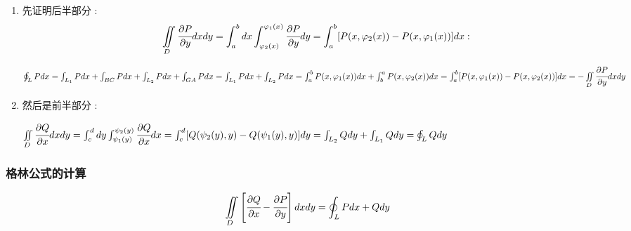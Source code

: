 \documentclass[UTF8,12pt]{ctexbook}
\newcommand{\definiteIntegral}[2]{\int^{#1}_{#2}}
\newcommand{\partialDerivativeFrac}[2]{\cfrac{\partial #1}{\partial #2}}
\newcommand{\doubleIntegralOnZone}[1]{\iint\limits_{#1}}
\newcommand{\mediumBigCase}[1]{\left[#1\right]}
\newcommand{\pathIntegral}[1]{\int_{#1}}
\newcommand{\curveIntegralOnLine}[1]{\oint_{#1}}
\begin{document}
{{{{      \begin{enumerate}
        \item {
              先证明后半部分 :
              $$
                \doubleIntegralOnZone{D}\partialDerivativeFrac{P}{y}dxdy = \definiteIntegral{b}{a}dx\definiteIntegral{\varphi_1(x)}{\varphi_2(x)}\partialDerivativeFrac{P}{y}dy = \definiteIntegral{b}{a}[P(x,\varphi_2(x)) - P(x,\varphi_1(x))]dx :
              $$

              \begin{math}
                \curveIntegralOnLine{L}Pdx \\
                = \pathIntegral{L_1}Pdx + \pathIntegral{BC}Pdx + \pathIntegral{L_2}Pdx + \pathIntegral{GA}Pdx \\
                = \pathIntegral{L_1}Pdx + \pathIntegral{L_2}Pdx \\
                = \definiteIntegral{b}{a}P(x,\varphi_1(x))dx + \definiteIntegral{a}{b}P(x,\varphi_2(x))dx \\
                = \definiteIntegral{b}{a}[P(x,\varphi_1(x)) - P(x,\varphi_2(x))]dx \\
                = -\doubleIntegralOnZone{D}\partialDerivativeFrac{P}{y}dxdy
              \end{math}
              }
        \item{
              然后是前半部分 :

              \begin{math}
                \doubleIntegralOnZone{D}\partialDerivativeFrac{Q}{x}dxdy \\
                = \definiteIntegral{d}{c}dy\definiteIntegral{\psi_2(y)}{\psi_1(y)}\partialDerivativeFrac{Q}{x}dx \\
                = \definiteIntegral{d}{c}[Q(\psi_2(y),y) - Q(\psi_1(y),y)]dy \\
                = \pathIntegral{L_2}Qdy + \pathIntegral{L_1}Qdy \\
                = \curveIntegralOnLine{L}Qdy
              \end{math}
              }
      \end{enumerate}
    }%

    \subsubsection{格林公式的计算}{
      $$
        \doubleIntegralOnZone{D}\mediumBigCase{\partialDerivativeFrac{Q}{x} - \partialDerivativeFrac{P}{y}}dxdy = \curveIntegralOnLine{L}Pdx + Qdy
      $$

}}}}
\end{document}
